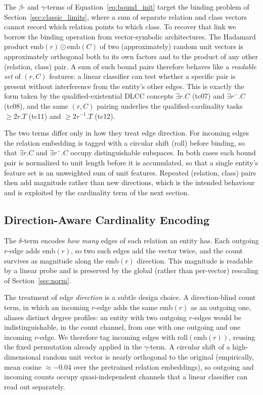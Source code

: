 \documentclass[a4paper,oneside,bibliography=totoc]{scrbook}
\begin{document}
The $\beta$- and $\gamma$-terms of Equation~\eqref{eq:bound_init} target the
binding problem of Section~\ref{sec:classic_limits}, where a sum of separate
relation and class vectors cannot record which relation points to which class.
To recover that link we borrow the binding operation from vector-symbolic
architectures. The Hadamard product $\mathrm{emb}(r) \odot \mathrm{emb}(C)$ of
two (approximately) random unit vectors is approximately orthogonal both to its
own factors and to the product of any other (relation, class) pair. A sum of
such bound pairs therefore behaves like a \emph{readable set} of $(r, C)$
features: a linear classifier can test whether a specific pair is present
without interference from the entity's other edges. This is exactly the form
taken by the qualified-existential DLCC concepts $\exists r.C$ (tc07) and
$\exists r^{-}.C$ (tc08), and the same $(r, C)$ pairing underlies the
qualified-cardinality tasks $\geq 2r.T$ (tc11) and $\geq 2r^{-1}.T$ (tc12).

The two terms differ only in how they treat edge direction. For incoming edges
the relation embedding is tagged with a circular shift ($\mathrm{roll}$) before
binding, so that $\exists r.C$ and $\exists r^{-}.C$ occupy distinguishable
subspaces. In both cases each bound pair is normalized to unit length before it
is accumulated, so that a single entity's feature set is an unweighted sum of
unit features. Repeated (relation, class) pairs then add magnitude rather than
new directions, which is the intended behaviour and is exploited by the
cardinality term of the next section.

\subsection{Direction-Aware Cardinality Encoding}
\label{sec:cardinality}

The $\delta$-term encodes \emph{how many} edges of each relation an entity has.
Each outgoing $r$-edge adds $\mathrm{emb}(r)$, so two such edges add the vector
twice, and the count survives as magnitude along the $\mathrm{emb}(r)$
direction. This magnitude is readable by a linear probe and is preserved by the
global (rather than per-vector) rescaling of Section~\ref{sec:norm}.

The treatment of edge \emph{direction} is a subtle design choice. A
direction-blind count term, in which an incoming $r$-edge adds the same
$\mathrm{emb}(r)$ as an outgoing one, aliases distinct degree profiles: an
entity with two outgoing $r$-edges would be indistinguishable, in the count
channel, from one with one outgoing and one incoming $r$-edge. We therefore tag
incoming edges with $\mathrm{roll}(\mathrm{emb}(r))$, reusing the fixed
permutation already applied in the $\gamma$-term. A circular shift of a
high-dimensional random unit vector is nearly orthogonal to the original
(empirically, mean cosine $\approx -0.04$ over the pretrained relation
embeddings), so outgoing and incoming counts occupy quasi-independent channels
that a linear classifier can read out separately.
\end{document}
